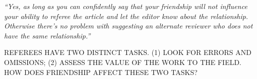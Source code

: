 \documentclass[12pt]{beamer}
\newcommand\gap{\vspace{5mm}}
\begin{document}
\begin{frame}

{\it ``Yes, as long as you can confidently say that your friendship will not influence your ability to referee the article and let the editor know about the relationship. Otherwise there’s no problem with suggesting an alternate reviewer who does not have the same relationship.''}




\gap

REFEREES HAVE TWO DISTINCT TASKS. (1) LOOK FOR ERRORS AND OMISSIONS; (2) ASSESS THE VALUE OF THE WORK TO THE FIELD. HOW DOES FRIENDSHIP AFFECT THESE TWO TASKS?

\end{frame}



\end{document}
